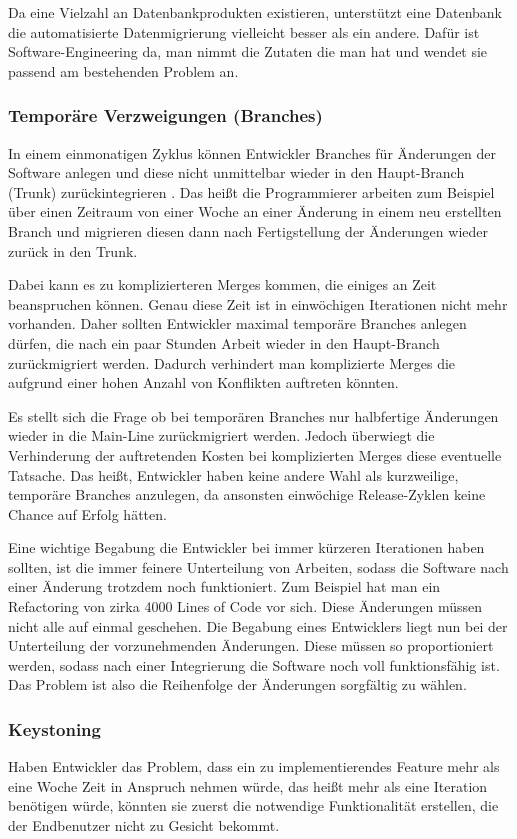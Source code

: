 Da eine Vielzahl an Datenbankprodukten existieren, unterstützt eine Datenbank die automatisierte Datenmigrierung vielleicht besser als ein andere. Dafür ist Software-Engineering da, man nimmt die Zutaten die man hat und wendet sie passend am bestehenden Problem an.

\subsubsection{Temporäre Verzweigungen (Branches)}
In einem einmonatigen Zyklus können Entwickler Branches für Änderungen der Software anlegen und diese nicht unmittelbar wieder in den Haupt-Branch (Trunk) zurückintegrieren \cite{dpunktkonfig2008}. Das heißt die Programmierer arbeiten zum Beispiel über einen Zeitraum von einer Woche an einer Änderung in einem neu erstellten Branch und migrieren diesen dann nach Fertigstellung der Änderungen wieder zurück in den Trunk. 

Dabei kann es zu komplizierteren Merges kommen, die einiges an Zeit beanspruchen können. Genau diese Zeit ist in einwöchigen Iterationen nicht mehr vorhanden. Daher sollten Entwickler maximal temporäre Branches anlegen dürfen, die nach ein paar Stunden Arbeit wieder in den Haupt-Branch zurückmigriert werden. Dadurch verhindert man komplizierte Merges die aufgrund einer hohen Anzahl von Konflikten auftreten könnten. 

Es stellt sich die Frage ob bei temporären Branches nur halbfertige Änderungen wieder in die Main-Line zurückmigriert werden. Jedoch überwiegt die Verhinderung der auftretenden Kosten bei komplizierten Merges diese eventuelle Tatsache. Das heißt, Entwickler haben keine andere Wahl als kurzweilige, temporäre Branches anzulegen, da ansonsten einwöchige Release-Zyklen keine Chance auf Erfolg hätten. 

Eine wichtige Begabung die Entwickler bei immer kürzeren Iterationen haben sollten, ist die immer feinere Unterteilung von Arbeiten, sodass die Software nach einer Änderung trotzdem noch funktioniert. Zum Beispiel hat man ein Refactoring von zirka 4000 Lines of Code vor sich. Diese Änderungen müssen nicht alle auf einmal geschehen. Die Begabung eines Entwicklers liegt nun bei der Unterteilung der vorzunehmenden Änderungen. Diese müssen so proportioniert werden, sodass nach einer Integrierung die Software noch voll funktionsfähig ist. Das Problem ist also die Reihenfolge der Änderungen sorgfältig zu wählen.

\subsubsection{Keystoning}
Haben Entwickler das Problem, dass ein zu implementierendes Feature mehr als eine Woche Zeit in Anspruch nehmen würde, das heißt mehr als eine Iteration benötigen würde, könnten sie zuerst die notwendige Funktionalität erstellen, die der Endbenutzer nicht zu Gesicht bekommt. 

